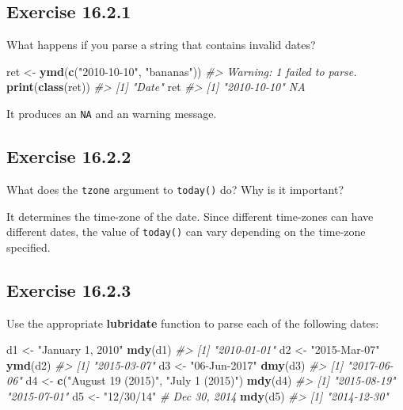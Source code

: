 \documentclass[]{book}
\newenvironment{Shaded}{\begin{snugshade}}{\end{snugshade}}
\newcommand{\CommentTok}[1]{\textcolor[rgb]{0.56,0.35,0.01}{\textit{#1}}}
\newcommand{\KeywordTok}[1]{\textcolor[rgb]{0.13,0.29,0.53}{\textbf{#1}}}
\newcommand{\NormalTok}[1]{#1}
\newcommand{\StringTok}[1]{\textcolor[rgb]{0.31,0.60,0.02}{#1}}
\theoremstyle{plain}
\theoremstyle{remark}
\theoremstyle{definition}
\theoremstyle{definition}
\theoremstyle{definition}
\theoremstyle{remark}
\begin{document}
\hypertarget{exercise-16.2.1}{%
\subsection*{\texorpdfstring{Exercise
{16.2.1}}{Exercise 16.2.1}}\label{exercise-16.2.1}}

What happens if you parse a string that contains invalid dates?

\begin{Shaded}
\begin{Highlighting}[]
\NormalTok{ret <-}\StringTok{ }\KeywordTok{ymd}\NormalTok{(}\KeywordTok{c}\NormalTok{(}\StringTok{"2010-10-10"}\NormalTok{, }\StringTok{"bananas"}\NormalTok{))}
\CommentTok{#> Warning: 1 failed to parse.}
\KeywordTok{print}\NormalTok{(}\KeywordTok{class}\NormalTok{(ret))}
\CommentTok{#> [1] "Date"}
\NormalTok{ret}
\CommentTok{#> [1] "2010-10-10" NA}
\end{Highlighting}
\end{Shaded}

It produces an \texttt{NA} and an warning message.

\hypertarget{exercise-16.2.2}{%
\subsection*{\texorpdfstring{Exercise
{16.2.2}}{Exercise 16.2.2}}\label{exercise-16.2.2}}

What does the \texttt{tzone} argument to \texttt{today()} do? Why is it
important?

It determines the time-zone of the date. Since different time-zones can
have different dates, the value of \texttt{today()} can vary depending
on the time-zone specified.

\hypertarget{exercise-16.2.3}{%
\subsection*{\texorpdfstring{Exercise
{16.2.3}}{Exercise 16.2.3}}\label{exercise-16.2.3}}

Use the appropriate \textbf{lubridate} function to parse each of the
following dates:

\begin{Shaded}
\begin{Highlighting}[]
\NormalTok{d1 <-}\StringTok{ "January 1, 2010"}
\KeywordTok{mdy}\NormalTok{(d1)}
\CommentTok{#> [1] "2010-01-01"}
\NormalTok{d2 <-}\StringTok{ "2015-Mar-07"}
\KeywordTok{ymd}\NormalTok{(d2)}
\CommentTok{#> [1] "2015-03-07"}
\NormalTok{d3 <-}\StringTok{ "06-Jun-2017"}
\KeywordTok{dmy}\NormalTok{(d3)}
\CommentTok{#> [1] "2017-06-06"}
\NormalTok{d4 <-}\StringTok{ }\KeywordTok{c}\NormalTok{(}\StringTok{"August 19 (2015)"}\NormalTok{, }\StringTok{"July 1 (2015)"}\NormalTok{)}
\KeywordTok{mdy}\NormalTok{(d4)}
\CommentTok{#> [1] "2015-08-19" "2015-07-01"}
\NormalTok{d5 <-}\StringTok{ "12/30/14"} \CommentTok{# Dec 30, 2014}
\KeywordTok{mdy}\NormalTok{(d5)}
\CommentTok{#> [1] "2014-12-30"}
\end{Highlighting}
\end{Shaded}
\end{document}
